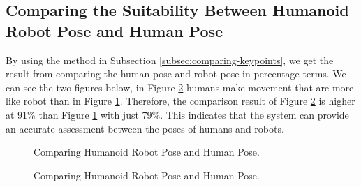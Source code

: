 \subsection{Comparing the Suitability Between Humanoid Robot Pose and Human Pose}
\label{subsec:comparingsuitability}

By using the method in Subsection \ref{subsec:comparing-keypoints}, we get the result from comparing the human pose and robot pose in percentage terms.
We can see the two figures below, in Figure \ref{fig:comparingb} humans make movement that are more like robot than in Figure \ref{fig:comparinga}.
Therefore, the comparison result of Figure \ref{fig:comparingb} is higher at 91\% than Figure \ref{fig:comparinga} with just 79\%.
This indicates that the system can provide an accurate assessment between the poses of humans and robots.

\begin{figure}
\centering
{}
\hfil
{}
\caption{Comparing Humanoid Robot Pose and Human Pose.}
\label{fig:comparinga}
\end{figure}

\begin{figure}
\centering
{}
\hfil
{}
\caption{Comparing Humanoid Robot Pose and Human Pose.}
\label{fig:comparingb}
\end{figure}